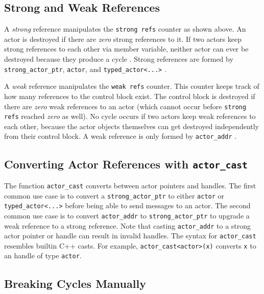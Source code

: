 \subsection{Strong and Weak References}

A \emph{strong} reference manipulates the \lstinline^strong refs^ counter as
shown above. An actor is destroyed if there are \emph{zero} strong references
to it. If two actors keep strong references to each other via member variable,
neither actor can ever be destroyed because they produce a cycle
. Strong references are formed by
\lstinline^strong_actor_ptr^, \lstinline^actor^, and
\lstinline^typed_actor<...>^ .

A \emph{weak} reference manipulates the \lstinline^weak refs^ counter. This
counter keeps track of how many references to the control block exist. The
control block is destroyed if there are \emph{zero} weak references to an actor
(which cannot occur before \lstinline^strong refs^ reached \emph{zero} as
well). No cycle occurs if two actors keep weak references to each other,
because the actor objects themselves can get destroyed independently from their
control block.  A weak reference is only formed by \lstinline^actor_addr^
.

\subsection{Converting Actor References with \lstinline^actor_cast^}
\label{actor-cast}

The function \lstinline^actor_cast^ converts between actor pointers and
handles. The first common use case is to convert a \lstinline^strong_actor_ptr^
to either \lstinline^actor^ or \lstinline^typed_actor<...>^ before being able
to send messages to an actor. The second common use case is to convert
\lstinline^actor_addr^ to \lstinline^strong_actor_ptr^ to upgrade a weak
reference to a strong reference. Note that casting \lstinline^actor_addr^ to a
strong actor pointer or handle can result in invalid handles. The syntax for
\lstinline^actor_cast^ resembles builtin C++ casts. For example,
\lstinline^actor_cast<actor>(x)^ converts \lstinline^x^ to an handle of type
\lstinline^actor^.

\subsection{Breaking Cycles Manually}
\label{breaking-cycles}

